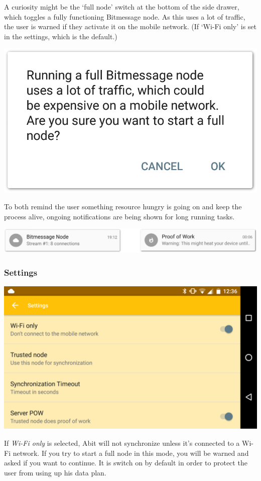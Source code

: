 \documentclass{bfh}
\begin{document}
  A curiosity might be the `full node' switch at the bottom of the side drawer, which toggles a fully functioning Bitmessage node. As this uses a lot of traffic, the user is warned if they activate it on the mobile network. (If `Wi-Fi only' is set in the settings, which is the default.)

  \begin{center}
    \includegraphics[width=0.4 \textwidth]{images/screenshots/warning_dialog.png}
  \end{center}

  To both remind the user something resource hungry is going on and keep the process alive, ongoing notifications are being shown for long running tasks.

  \begin{center}
    \includegraphics[width=0.8 \textwidth]{images/screenshots/ongoing_notifications.png}
  \end{center}

  \subsubsection{Settings}

  \begin{center}
    \includegraphics[width=0.8 \textwidth]{images/screenshots/settings.png}
  \end{center}

  If \textit{Wi-Fi only} is selected, Abit will not synchronize unless it's connected to a Wi-Fi network. If you try to start a full node in this mode, you will be warned and asked if you want to continue. It is switch on by default in order to protect the user from using up his data plan.
\end{document}
